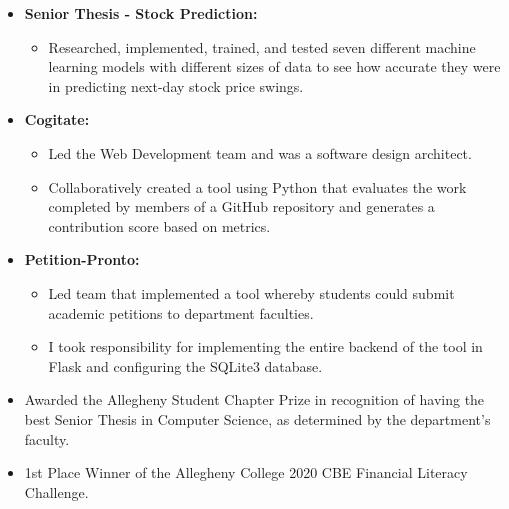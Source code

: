



\begin{itemize}

\item \textbf{Senior Thesis - Stock Prediction:}
\begin{itemize}
    \item Researched, implemented, trained, and tested seven different machine learning models with different sizes of data to see how accurate they were in predicting next-day stock price swings.
\end{itemize}

\item \textbf{Cogitate:}
\begin{itemize}
    \item Led the Web Development team and was a software design architect.
    \item Collaboratively created a tool using Python that evaluates the work completed by members of a GitHub repository and generates a contribution score based on metrics.
\end{itemize}

\item \textbf{Petition-Pronto:}
\begin{itemize}
    \item Led team that implemented a tool whereby students could submit academic petitions to department faculties.
    \item I took responsibility for implementing the entire backend of the tool in Flask and configuring the SQLite3 database.
\end{itemize}
\end{itemize}






\begin{itemize}
\item Awarded the Allegheny Student Chapter Prize in recognition of having the best Senior Thesis in Computer Science, as determined by the department's faculty.
\item 1st Place Winner of the Allegheny College 2020 CBE Financial Literacy Challenge.
\end{itemize}


